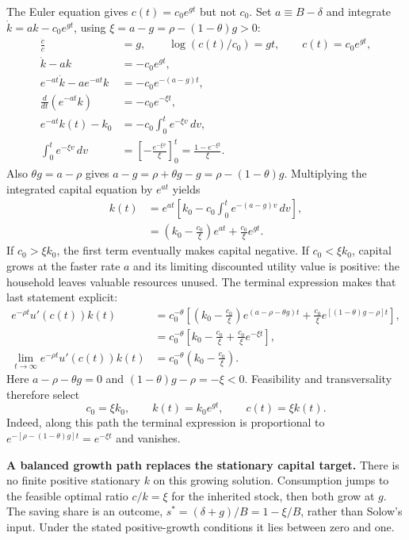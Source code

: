 The Euler equation gives $c(t)=c_0e^{gt}$ but not $c_0$. Set
$a\equiv B-\delta$ and integrate $\dot k=ak-c_0e^{gt}$, using
$\xi=a-g=\rho-(1-\theta)g>0$:
\begin{align}
\frac{\dot c}{c}&=g,
 \qquad\log(c(t)/c_0)=gt,\qquad c(t)=c_0e^{gt},\\
\dot k-ak&=-c_0e^{gt},\\
e^{-at}\dot k-ae^{-at}k&=-c_0e^{-(a-g)t},\\
\frac{d}{dt}(e^{-at}k)&=-c_0e^{-\xi t},\\
e^{-at}k(t)-k_0&=-c_0\int_0^t e^{-\xi v}\,dv,\\
\int_0^t e^{-\xi v}\,dv
 &=\left[-\frac{e^{-\xi v}}{\xi}\right]_0^t
   =\frac{1-e^{-\xi t}}{\xi}.
\end{align}
Also $\theta g=a-\rho$ gives
$a-g=\rho+\theta g-g=\rho-(1-\theta)g$.
Multiplying the integrated capital equation by $e^{at}$ yields
\begin{align}
k(t)&=e^{at}\left[k_0-c_0\int_0^t e^{-(a-g)v}\,dv\right],\\
&=\left(k_0-\frac{c_0}{\xi}\right)e^{at}
  +\frac{c_0}{\xi}e^{gt}.
\end{align}
If $c_0>\xi k_0$, the first term eventually makes capital negative. If
$c_0<\xi k_0$, capital grows at the faster rate $a$ and its limiting discounted
utility value is positive: the household leaves valuable resources unused.
The terminal expression makes that last statement explicit:
\begin{align}
e^{-\rho t}u'(c(t))k(t)
 &=c_0^{-\theta}\left[
   \left(k_0-\frac{c_0}{\xi}\right)e^{(a-\rho-\theta g)t}
   +\frac{c_0}{\xi}e^{[(1-\theta)g-\rho]t}\right],\\
 &=c_0^{-\theta}\left[k_0-\frac{c_0}{\xi}
                       +\frac{c_0}{\xi}e^{-\xi t}\right],\\
\lim_{t\to\infty}e^{-\rho t}u'(c(t))k(t)
 &=c_0^{-\theta}\left(k_0-\frac{c_0}{\xi}\right).
\end{align}
Here $a-\rho-\theta g=0$ and $(1-\theta)g-\rho=-\xi<0$.
Feasibility and transversality therefore select
\begin{equation}\label{eq:eg-ak-path}
c_0=\xi k_0,\qquad k(t)=k_0e^{gt},\qquad c(t)=\xi k(t).
\end{equation}
Indeed, along this path the terminal expression is proportional to
$e^{-[\rho-(1-\theta)g]t}=e^{-\xi t}$ and vanishes.

\begin{greenblock}
\textbf{A balanced growth path replaces the stationary capital target.}
There is no finite positive stationary $k$ on this growing solution.
Consumption jumps to the feasible optimal ratio $c/k=\xi$ for the inherited
stock, then both grow at $g$. The saving share is an outcome,
$s^*=(\delta+g)/B=1-\xi/B$, rather than Solow's input. Under the stated
positive-growth conditions it lies between zero and one.
\end{greenblock}

